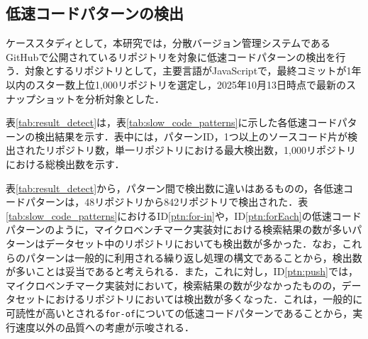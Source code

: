 \documentclass[submit,techrep,noauthor]{ipsj}
\begin{document}
\subsection{低速コードパターンの検出}

ケーススタディとして，本研究では，分散バージョン管理システムであるGitHubで公開されているリポジトリを対象に低速コードパターンの検出を行う．対象とするリポジトリとして，主要言語がJavaScriptで，最終コミットが1年以内のスター数上位1,000リポジトリを選定し，2025年10月13日時点で最新のスナップショットを分析対象とした．

表\ref{tab:result_detect}は，表\ref{tab:slow_code_patterns}に示した各低速コードパターンの検出結果を示す．表中には，パターンID，1つ以上のソースコード片が検出されたリポジトリ数，単一リポジトリにおける最大検出数，1,000リポジトリにおける総検出数を示す．

表\ref{tab:result_detect}から，パターン間で検出数に違いはあるものの，各低速コードパターンは，48リポジトリから842リポジトリで検出された．表\ref{tab:slow_code_patterns}におけるID\ref{ptn:for-in}や，ID\ref{ptn:forEach}の低速コードパターンのように，マイクロベンチマーク実装対における検索結果の数が多いパターンはデータセット中のリポジトリにおいても検出数が多かった．なお，これらのパターンは一般的に利用される繰り返し処理の構文であることから，検出数が多いことは妥当であると考えられる．また，これに対し，ID\ref{ptn:push}では，マイクロベンチマーク実装対において，検索結果の数が少なかったものの，データセットにおけるリポジトリにおいては検出数が多くなった．これは，一般的に可読性が高いとされる\texttt{for-of}についての低速コードパターンであることから，実行速度以外の品質への考慮が示唆される．

\begin{table}[t]
    \centering
    \caption{低速コードパターンに基づく検出結果}
    \label{tab:result_detect}
\end{table}
\end{document}
